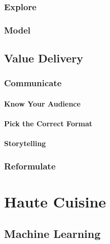 \documentclass[
]{book}
\begin{document}
\hypertarget{explore-1}{%
\section{Explore}\label{explore-1}}

\hypertarget{model-1}{%
\section{Model}\label{model-1}}

\hypertarget{value-delivery}{%
\chapter{Value Delivery}\label{value-delivery}}

\hypertarget{communicate-1}{%
\section{Communicate}\label{communicate-1}}

\hypertarget{know-your-audience}{%
\subsection{Know Your Audience}\label{know-your-audience}}

\hypertarget{pick-the-correct-format}{%
\subsection{Pick the Correct Format}\label{pick-the-correct-format}}

\hypertarget{storytelling}{%
\subsection{Storytelling}\label{storytelling}}

\hypertarget{reformulate-1}{%
\section{Reformulate}\label{reformulate-1}}

\hypertarget{part-haute-cuisine}{%
\part*{Haute Cuisine}\label{part-haute-cuisine}}

\hypertarget{machine_learning}{%
\chapter{Machine Learning}\label{machine_learning}}
\end{document}
